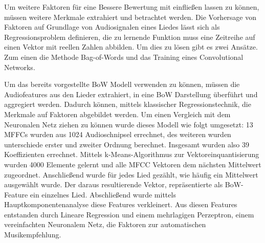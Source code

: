 \documentclass[twosided,a4,10pt]{article}
\begin{document}
\begin{multicols}{2}
		Um weitere Faktoren für eine Bessere Bewertung mit einfließen lassen zu können, müssen weitere Merkmale extrahiert und betrachtet werden. Die Vorhersage von Faktoren auf Grundlage von Audiosignalen eines Liedes lässt sich als Regressionsproblem definieren, die zu lernende Funktion muss eine Zeitreihe auf einen Vektor mit reellen Zahlen abbilden. Um dies zu lösen gibt es zwei Ansätze. Zum einen die Methode Bag-of-Words und das Training eines Convolutional Networks.
		
		
		
		Um das bereits vorgestellte BoW Modell verwenden zu können, müssen die Audiofeatures aus den Lieder extrahiert, in eine BoW Darstellung überführt und aggregiert werden. Dadurch können, mittels klassischer Regressionstechnik, die Merkmale auf Faktoren abgebildet werden. Um einen Vergleich mit dem Neuronalen Netz ziehen zu können wurde dieses Modell wie folgt umgesetzt:
		13 MFFCs wurden aus 1024 Audioschnipsel errechnet, des weiteren wurden unterschiede erster und zweiter Ordnung berechnet. Insgesamt wurden also 39 Koeffizienten errechnet. Mittels k-Means-Algorithmus zur Vektoreinquantisierung wurden 4000 Elemente gelernt und alle MFCC Vektoren dem nächsten Mittelwert zugeordnet. Anschließend wurde für jedes Lied gezählt, wie häufig ein Mittelwert ausgewählt wurde. Der daraus resultierende Vektor, repräsentierte als BoW-Feature ein einzelnes Lied. Abschließend wurde mittels Hauptkomponentenanalyse diese Features verkleinert. Aus diesen Features entstanden durch Lineare Regression und einem mehrlagigen Perzeptron, einem vereinfachten Neuronalem Netz, die Faktoren zur automatischen Musikempfehlung. %
		\newline
		

\end{multicols}
\end{document}
